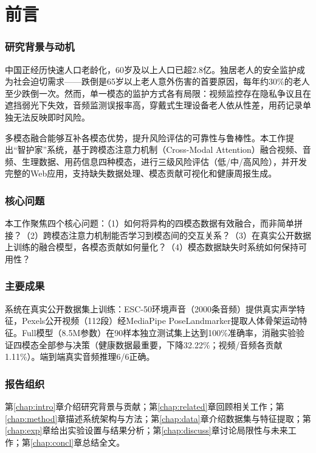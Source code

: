 \chapter*{前言}

\subsection*{研究背景与动机}

中国正经历快速人口老龄化，60岁及以上人口已超2.8亿。独居老人的安全监护成为社会迫切需求——跌倒是65岁以上老人意外伤害的首要原因，每年约30\%的老人至少跌倒一次。然而，单一模态的监护方式各有局限：视频监控存在隐私争议且在遮挡弱光下失效，音频监测误报率高，穿戴式生理设备老人依从性差，用药记录单独无法反映即时风险。

多模态融合能够互补各模态优势，提升风险评估的可靠性与鲁棒性。本工作提出``智护家''系统，基于跨模态注意力机制（Cross-Modal Attention）融合视频、音频、生理数据、用药信息四种模态，进行三级风险评估（低/中/高风险），并开发完整的Web应用，支持缺失数据处理、模态贡献可视化和健康周报生成。

\subsection*{核心问题}

本工作聚焦四个核心问题：（1）如何将异构的四模态数据有效融合，而非简单拼接？（2）跨模态注意力机制能否学习到模态间的交互关系？（3）在真实公开数据上训练的融合模型，各模态贡献如何量化？（4）模态数据缺失时系统如何保持可用性？

\subsection*{主要成果}

系统在真实公开数据集上训练：ESC-50环境声音（2000条音频）提供真实声学特征，Pexels公开视频（112段）经MediaPipe PoseLandmarker提取人体骨架运动特征。Full模型（8.5M参数）在90样本独立测试集上达到100\%准确率，消融实验验证四模态全部参与决策（健康数据最重要，下降32.22\%；视频/音频各贡献1.11\%）。端到端真实音频推理6/6正确。

\subsection*{报告组织}

第\ref{chap:intro}章介绍研究背景与贡献；第\ref{chap:related}章回顾相关工作；第\ref{chap:method}章描述系统架构与方法；第\ref{chap:data}章介绍数据集与特征提取；第\ref{chap:exp}章给出实验设置与结果分析；第\ref{chap:discuss}章讨论局限性与未来工作；第\ref{chap:concl}章总结全文。
